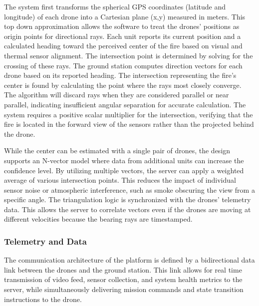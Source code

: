 \documentclass[journal, onecolumn]{IEEEtran}
\begin{document}
The system first transforms the spherical GPS coordinates (latitude and longitude) of each drone into a Cartesian plane (x,y) measured in meters. This top down approximation allows the software to treat the drones’ positions as origin points for directional rays. Each unit reports its current position and a calculated heading toward the perceived center of the fire based on visual and thermal sensor alignment. The intersection point is determined by solving for the crossing of these rays. The ground station computes direction vectors for each drone based on its reported heading. The intersection representing the fire’s center is found by calculating the point where the rays most closely converge. The algorithm will discard rays when they are considered parallel or near parallel, indicating insufficient angular separation for accurate calculation. The system requires a positive scalar multiplier for the intersection, verifying that the fire is located in the forward view of the sensors rather than the projected behind the drone.

While the center can be estimated with a single pair of drones, the design supports an N-vector model where data from additional units can increase the confidence level. By utilizing multiple vectors, the server can apply a weighted average of various intersection points. This reduces the impact of individual sensor noise or atmospheric interference, such as smoke obscuring the view from a specific angle. The triangulation logic is synchronized with the drones’ telemetry data. This allows the server to correlate vectors even if the drones are moving at different velocities because the bearing rays are timestamped.

\vspace{0.5em}
\subsubsection{Telemetry and Data}
The communication architecture of the platform is defined by a bidirectional data link between the drones and the ground station. This link allows for real time transmission of video feed, sensor collection, and system health metrics to the server, while simultaneously delivering mission commands and state transition instructions to the drone.
\vspace{0.5em}
\end{document}
